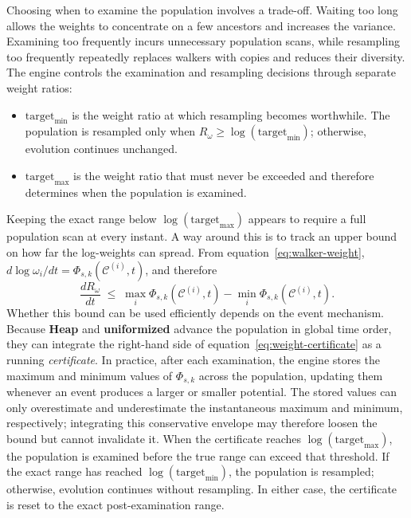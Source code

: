 \documentclass[11pt]{article}
\begin{document}
Choosing when to examine the population involves a trade-off. Waiting too long allows the weights to concentrate on a few ancestors and increases the variance. Examining too frequently incurs unnecessary population scans, while resampling too frequently repeatedly replaces walkers with copies and reduces their diversity. The engine controls the examination and resampling decisions through separate weight ratios:
\begin{itemize}
\item $\text{target}_{\min}$ is the weight ratio at which resampling becomes worthwhile. The population is resampled only when $R_\omega\geq\log(\text{target}_{\min})$; otherwise, evolution continues unchanged.
\item $\text{target}_{\max}$ is the weight ratio that must never be exceeded and therefore determines when the population is examined.
\end{itemize}

Keeping the exact range below $\log(\text{target}_{\max})$ appears to require a full population scan at every instant. A way around this is to track an upper bound on how far the log-weights can spread. From equation~\ref{eq:walker-weight}, $d\log \omega_i/dt=\Phi_{s,k}(\mathcal{C}^{(i)},t)$, and therefore
\begin{equation}
    \frac{d R_\omega}{dt} \;\le\;
    \max_i\Phi_{s,k}(\mathcal{C}^{(i)},t)
    -\min_i\Phi_{s,k}(\mathcal{C}^{(i)},t).
    \label{eq:weight-certificate}
\end{equation}
Whether this bound can be used efficiently depends on the event mechanism. Because \textcolor{heapcol}{\textbf{Heap}} and \textcolor{unifcol}{\textbf{uniformized}} advance the population in global time order, they can integrate the right-hand side of equation~\ref{eq:weight-certificate} as a running \emph{certificate}. In practice, after each examination, the engine stores the maximum and minimum values of $\Phi_{s,k}$ across the population, updating them whenever an event produces a larger or smaller potential. The stored values can only overestimate and underestimate the instantaneous maximum and minimum, respectively; integrating this conservative envelope may therefore loosen the bound but cannot invalidate it. When the certificate reaches $\log(\text{target}_{\max})$, the population is examined before the true range can exceed that threshold. If the exact range has reached $\log(\text{target}_{\min})$, the population is resampled; otherwise, evolution continues without resampling. In either case, the certificate is reset to the exact post-examination range.
\end{document}
